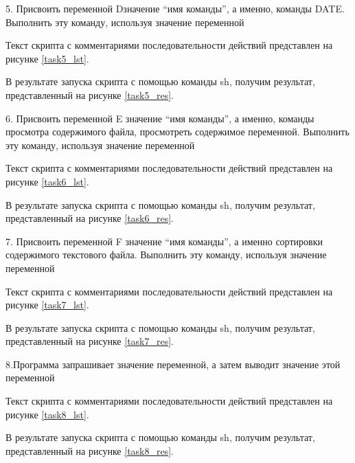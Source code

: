 
5. Присвоить переменной Dзначение “имя команды”, а именно, команды DATE. Выполнить эту команду, используя значение переменной

Текст скрипта с комментариями последовательности действий представлен на рисунке \ref{task5_lst}.


В результате запуска скрипта с помощью команды sh, получим результат, представленный на рисунке \ref{task5_res}.


6. Присвоить переменной E значение “имя команды”, а именно, команды просмотра   содержимого   файла,   просмотреть   содержимое   переменной. Выполнить эту команду, используя значение переменной

Текст скрипта с комментариями последовательности действий представлен на рисунке \ref{task6_lst}.


В результате запуска скрипта с помощью команды sh, получим результат, представленный на рисунке \ref{task6_res}.


7.  Присвоить  переменной F значение  “имя  команды”,  а  именно сортировки содержимого текстового файла. Выполнить эту команду, используя значение переменной

Текст скрипта с комментариями последовательности действий представлен на рисунке \ref{task7_lst}.


В результате запуска скрипта с помощью команды sh, получим результат, представленный на рисунке \ref{task7_res}.


8.Программа  запрашивает  значение  переменной,  а  затем  выводит значение этой переменной

Текст скрипта с комментариями последовательности действий представлен на рисунке \ref{task8_lst}.


В результате запуска скрипта с помощью команды sh, получим результат, представленный на рисунке \ref{task8_res}.

